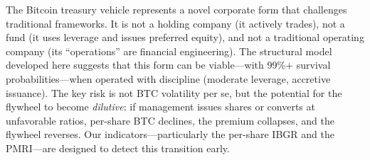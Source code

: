 The Bitcoin treasury vehicle represents a novel corporate form that challenges traditional frameworks. It is not a holding company (it actively trades), not a fund (it uses leverage and issues preferred equity), and not a traditional operating company (its ``operations'' are financial engineering). The structural model developed here suggests that this form can be viable---with 99\%+ survival probabilities---when operated with discipline (moderate leverage, accretive issuance). The key risk is not BTC volatility per se, but the potential for the flywheel to become \emph{dilutive}: if management issues shares or converts at unfavorable ratios, per-share BTC declines, the premium collapses, and the flywheel reverses. Our indicators---particularly the per-share IBGR and the PMRI---are designed to detect this transition early.

